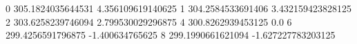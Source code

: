 0 305.1824035644531 4.356109619140625
1 304.2584533691406 3.432159423828125
2 303.6258239746094 2.799530029296875
4 300.8262939453125 0.0
6 299.4256591796875 -1.400634765625
8 299.1990661621094 -1.627227783203125
